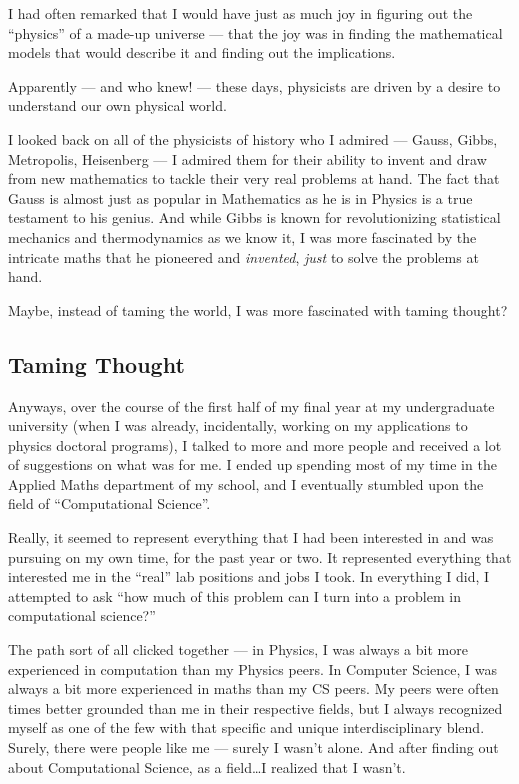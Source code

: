 \documentclass[]{article}
\begin{document}
I had often remarked that I would have just as much joy in figuring out
the ``physics'' of a made-up universe --- that the joy was in finding
the mathematical models that would describe it and finding out the
implications.

Apparently --- and who knew! --- these days, physicists are driven by a
desire to understand our own physical world.

I looked back on all of the physicists of history who I admired ---
Gauss, Gibbs, Metropolis, Heisenberg --- I admired them for their
ability to invent and draw from new mathematics to tackle their very
real problems at hand. The fact that Gauss is almost just as popular in
Mathematics as he is in Physics is a true testament to his genius. And
while Gibbs is known for revolutionizing statistical mechanics and
thermodynamics as we know it, I was more fascinated by the intricate
maths that he pioneered and \emph{invented}, \emph{just} to solve the
problems at hand.

Maybe, instead of taming the world, I was more fascinated with taming
thought?

\subsection{Taming Thought}\label{taming-thought}

Anyways, over the course of the first half of my final year at my
undergraduate university (when I was already, incidentally, working on
my applications to physics doctoral programs), I talked to more and more
people and received a lot of suggestions on what was for me. I ended up
spending most of my time in the Applied Maths department of my school,
and I eventually stumbled upon the field of ``Computational Science''.

Really, it seemed to represent everything that I had been interested in
and was pursuing on my own time, for the past year or two. It
represented everything that interested me in the ``real'' lab positions
and jobs I took. In everything I did, I attempted to ask ``how much of
this problem can I turn into a problem in computational science?''

The path sort of all clicked together --- in Physics, I was always a bit
more experienced in computation than my Physics peers. In Computer
Science, I was always a bit more experienced in maths than my CS peers.
My peers were often times better grounded than me in their respective
fields, but I always recognized myself as one of the few with that
specific and unique interdisciplinary blend. Surely, there were people
like me --- surely I wasn't alone. And after finding out about
Computational Science, as a field\ldots{}I realized that I wasn't.
\end{document}
